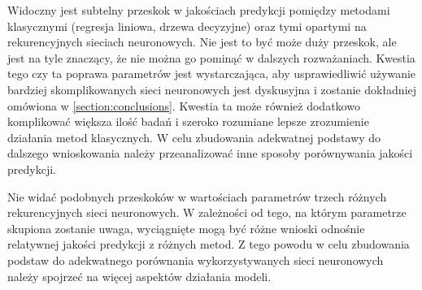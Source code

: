 \documentclass[10pt,a4paper]{article}
\begin{document}
Widoczny jest subtelny przeskok w jakościach predykcji pomiędzy metodami klasycznymi (regresja liniowa, drzewa decyzyjne) oraz tymi opartymi na rekurencyjnych sieciach neuronowych. Nie jest to być może duży przeskok, ale jest na tyle znaczący, że nie można go pominąć w dalszych rozważaniach. Kwestia tego czy ta poprawa parametrów jest wystarczająca, aby usprawiedliwić używanie bardziej skomplikowanych sieci neuronowych jest dyskusyjna i zostanie dokładniej omówiona w \autoref{section:conclusions}. Kwestia ta może również dodatkowo komplikować większa ilość badań i szeroko rozumiane lepsze zrozumienie działania metod klasycznych. W celu zbudowania adekwatnej podstawy do dalszego wnioskowania należy przeanalizować inne sposoby porównywania jakości predykcji. 

Nie widać podobnych przeskoków w wartościach parametrów trzech różnych rekurencyjnych sieci neuronowych. W zależności od tego, na którym parametrze skupiona zostanie uwaga, wyciągnięte mogą być różne wnioski odnośnie relatywnej jakości predykcji z różnych metod. Z tego powodu w celu zbudowania podstaw do adekwatnego porównania wykorzystywanych sieci neuronowych należy spojrzeć na więcej aspektów działania modeli.
\end{document}
